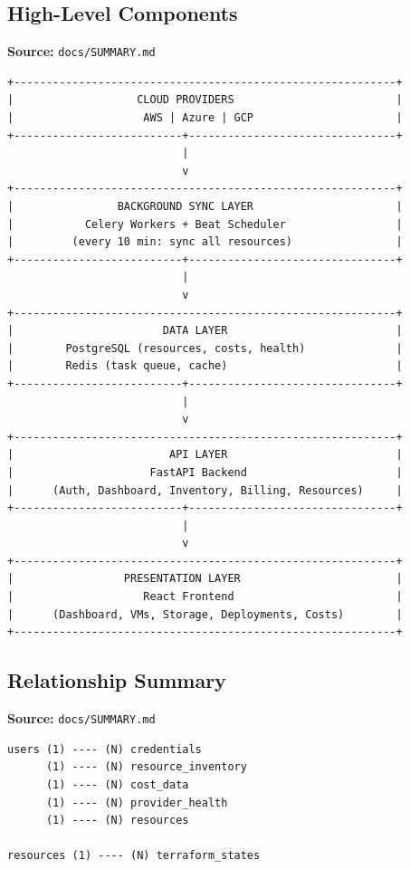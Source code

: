 \subsection{High-Level Components}
\textbf{Source:} \texttt{docs/SUMMARY.md}
\begin{lstlisting}[numbers=none,basicstyle=\ttfamily\tiny,caption={High-Level Components Adapted from docs/SUMMARY.md}]
+-----------------------------------------------------------+
|                   CLOUD PROVIDERS                         |
|                    AWS | Azure | GCP                      |
+--------------------------+--------------------------------+
                           |
                           v
+-----------------------------------------------------------+
|                BACKGROUND SYNC LAYER                      |
|           Celery Workers + Beat Scheduler                 |
|         (every 10 min: sync all resources)                |
+--------------------------+--------------------------------+
                           |
                           v
+-----------------------------------------------------------+
|                       DATA LAYER                          |
|        PostgreSQL (resources, costs, health)              |
|        Redis (task queue, cache)                          |
+--------------------------+--------------------------------+
                           |
                           v
+-----------------------------------------------------------+
|                        API LAYER                          |
|                     FastAPI Backend                       |
|      (Auth, Dashboard, Inventory, Billing, Resources)     |
+--------------------------+--------------------------------+
                           |
                           v
+-----------------------------------------------------------+
|                 PRESENTATION LAYER                        |
|                    React Frontend                         |
|      (Dashboard, VMs, Storage, Deployments, Costs)        |
+-----------------------------------------------------------+
\end{lstlisting}

\subsection{Relationship Summary}
\textbf{Source:} \texttt{docs/SUMMARY.md}
\begin{lstlisting}[numbers=none,basicstyle=\ttfamily\tiny,caption={Relationship Summary Adapted from docs/SUMMARY.md}]
users (1) ---- (N) credentials
      (1) ---- (N) resource_inventory
      (1) ---- (N) cost_data
      (1) ---- (N) provider_health
      (1) ---- (N) resources

resources (1) ---- (N) terraform_states
\end{lstlisting}

